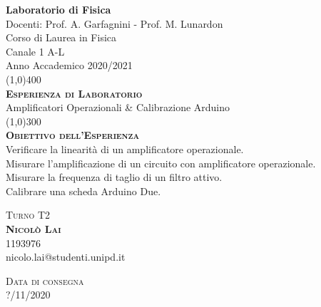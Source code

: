 \documentclass[a4paper,11pt]{article} %
\makeatletter
\newcommand{\labcourse}{Laboratorio di Fisica}
\newcommand{\teacher}{Docenti: Prof. A. Garfagnini - Prof. M. Lunardon}
\newcommand{\laurea}{Corso di Laurea in Fisica}
\newcommand{\channel}{Canale 1 A-L}
\newcommand{\academicyear}{Anno Accademico 2020/2021}
\newcommand{\labexp}{Esperienza di Laboratorio}
\newcommand{\exptitle}{Amplificatori Operazionali \& Calibrazione Arduino}
\newcommand{\expobj}{Obiettivo dell'Esperienza}
\newcommand{\objectives}{Verificare la linearità di un amplificatore operazionale.}
\newcommand{\objectivess}{Misurare l'amplificazione di un circuito con amplificatore operazionale.}
\newcommand{\objectivesss}{Misurare la frequenza di taglio di un filtro attivo.}
\newcommand{\objectivessss}{Calibrare una scheda Arduino Due.}
\newcommand{\turno}{Turno T2}
\newcommand{\name}{Nicolò Lai}
\newcommand{\matricola}{1193976}
\newcommand{\mail}{nicolo.lai@studenti.unipd.it}
\newcommand{\consegna}{Data di consegna}
\newcommand{\data}{?/11/2020}
\makeatother
\begin{document}
\def\sectionautorefname{Sezione} 
\def\subsectionautorefname{Sezione} 
\def\subsubsectionautorefname{Sezione}


	\begin{titlepage}

		\begin{center}
			\Huge{\bfseries \labcourse}\\
				
			\LARGE \teacher \\
			\Large \laurea\\
			\Large \channel\\
			\Large \academicyear\\
			[1cm] 
			\line(1,0){400}\\
			[2cm]
				
			\textsc{\huge{\bfseries \labexp}}\\
			\huge{\exptitle}\\
			[2mm] \line(1,0){300}\\
			[3mm]

			\textsc{\Large{\bfseries \expobj}}\\
			\large{
				\objectives\\
				\objectivess\\
				\objectivesss\\
				\objectivessss
			}\\
			[7.5cm]
		\end{center}
		
		
		\begin{flushleft}
			\textsc{\Large \turno}\\
			[0.5cm] \textsc{\large {\bfseries \name}} \\ 
			\indent\large \matricola \\ 
			\indent\large \mail \\
		\end{flushleft}
			
						
		\begin{flushright}
				\textsc{\Large\consegna}\\
				\textsc{\large \data}					
		\end{flushright}
				
	\end{titlepage}
\cleardoublepage


\end{document}
